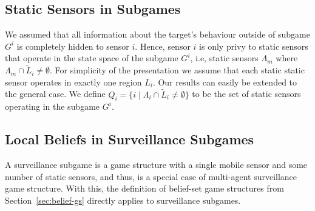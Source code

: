 \subsection{Static Sensors in Subgames}
We assumed that all information about the target's behaviour outside of subgame $G^i$ is completely  hidden to sensor $i$. Hence, sensor $i$ is only privy to static sensors that operate in the state space of the subgame $G^i$, i.e, static sensors $\Lambda_m$ where $\Lambda_m \cap \widetilde{L}_i \neq \emptyset$. For simplicity of the presentation we assume that each static static sensor operates in exactly one region $L_i$. Our results can easily be extended to the general case. We define $Q_i = \{i \mid \Lambda_{i} \cap \widetilde{L}_i \neq \emptyset\}$ to be the set of static sensors operating in the subgame  $G^i$. 

\subsection{Local Beliefs in Surveillance Subgames}\label{sec:local-games}
A surveillance subgame is a game structure with a single mobile sensor and some number of static sensors, and thus, is  a special case of multi-agent surveillance game structure. With this, the definition of  belief-set game structures from Section~\ref{sec:belief-gs} directly applies to surveillance subgames.

